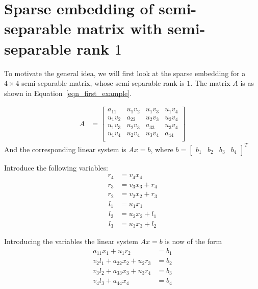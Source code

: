 \documentclass[final,leqno]{siamltex}
\begin{document}
\section{Sparse embedding of semi-separable matrix with semi-separable rank $1$}
To motivate the general idea, we will first look at the sparse embedding for a $4 \times 4$ semi-separable matrix, whose semi-separable rank is $1$. The matrix $A$ is as shown in Equation~\eqref{eqn_first_example}.

\begin{align}
A & =
\begin{bmatrix}
a_{11} & u_1v_2 & u_1v_3 & u_1v_4\\
u_1v_2 & a_{22} & u_2v_3 & u_2v_4\\
u_1v_3 & u_2v_3 & a_{33} & u_3v_4\\
u_1v_4 & u_2v_4 & u_3v_4 & a_{44}\\
\end{bmatrix}
\label{eqn_first_example}
\end{align}
And the corresponding linear system is $Ax=b$, where $b=\begin{bmatrix} b_1& b_2& b_3& b_4 \end{bmatrix}^T$

Introduce the following variables:
\begin{align}
r_4 & = v_4x_4\\
r_3 & = v_3x_3 + r_4\\
r_2 & = v_2x_2 + r_3
\end{align}
\begin{align}
l_1 & = u_1x_1\\
l_2 & = u_2x_2 + l_1\\
l_3 & = u_3x_3 + l_2
\end{align}

Introducing the variables the linear system $Ax=b$ is now of the form
\begin{align}
a_{11}x_1 + u_1r_2 & = b_1\\
v_2 l_1 + a_{22}x_2 + u_2r_3 & = b_2\\
v_3 l_2 + a_{33}x_3 + u_3r_4 & = b_3\\
v_4 l_3 + a_{44}x_4 & = b_4
\end{align}
\end{document}
